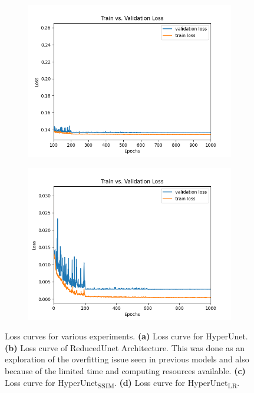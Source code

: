 \documentclass{article}
\begin{document}
\begin{figure}[!htb]
    \begin{subfigure}[b]{0.48\textwidth}
        \centering
        \includegraphics[width=\textwidth]{figs/ClassicUnetSSIM_LR/curves/loss_curve_zoom.png}
        \caption{}
        \label{fig:loss_curve_UnetSSIMzoom_model}
    \end{subfigure}
    \hfill
    \begin{subfigure}[b]{0.48\textwidth}
        \centering
        \includegraphics[width=\textwidth]{figs/ClassicUnet_LR/curves/loss_curve.png}
        \caption{}
        \label{fig:loss_curve_HyperNetLR_model}
    \end{subfigure}

    
    \caption{Loss curves for various experiments. \textbf{(a)} Loss curve for HyperUnet. \textbf{(b)} Loss curve of ReducedUnet Architecture. This was done as an exploration of the overfitting issue seen in previous models and also because of the limited time and computing resources available. \textbf{(c)} Loss curve for HyperUnet\textsubscript{SSIM}. \textbf{(d)} Loss curve for HyperUnet\textsubscript{LR}.}
    \label{fig:loss_curve_all}
    
\end{figure}
\end{document}
